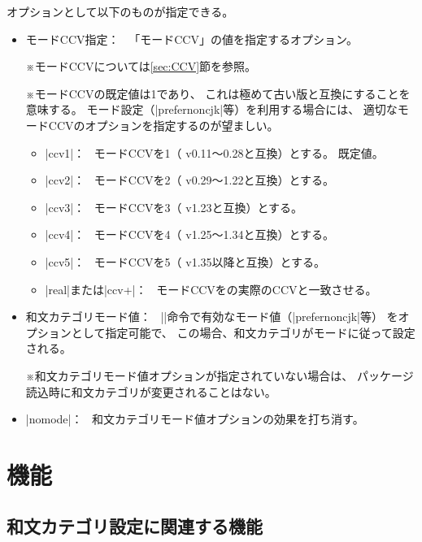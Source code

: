 \documentclass[uplatex,dvipdfmx,a4paper]{jsarticle}
\newenvironment{myverbatim}
  {\quote\small\verbatim}
  {\endverbatim\endquote}
\newcommand{\Note}{\par\noindent ※}
\newcommand{\Means}{：~}
\newcommand{\strong}{\textsf}
\begin{document}
\begin{myverbatim}
\usepackage[<オプション>]{pxcjkcat}
\end{myverbatim}

オプションとして以下のものが指定できる。

\begin{itemize}
\item \strong{モードCCV指定}\Means
  \<「モードCCV」の値を指定するオプション。
  \Note モードCCVについては\ref{sec:CCV}節を参照。
  \Note モードCCVの既定値は1であり、
  これは極めて古い版と互換にすることを意味する。
  モード設定（|prefernoncjk|等）を利用する場合には、
  適切なモードCCVのオプションを指定するのが望ましい。
  \begin{itemize}
  \item |ccv1|\Means
    モードCCVを1（{\upTeX} v0.11～0.28と互換）とする。
    \strong{既定値。}
  \item |ccv2|\Means
    モードCCVを2（{\upTeX} v0.29～1.22と互換）とする。
  \item |ccv3|\Means
    モードCCVを3（{\upTeX} v1.23と互換）とする。
  \item |ccv4|\Means
    モードCCVを4（{\upTeX} v1.25～1.34と互換）とする。
  \item |ccv5|\Means
    モードCCVを5（{\upTeX} v1.35以降と互換）とする。
  \item |real|または|ccv+|\Means
    モードCCVを{\upTeX}の実際のCCVと一致させる。
  \end{itemize}
\item \strong{和文カテゴリモード値}\Means
  |\cjkcategorymode|命令で有効なモード値（|prefernoncjk|等）
  をオプションとして指定可能で、
  この場合、和文カテゴリがモードに従って設定される。
  \Note 和文カテゴリモード値オプションが指定されていない場合は、
  パッケージ読込時に和文カテゴリが変更されることはない。
\item |nomode|\Means
  和文カテゴリモード値オプションの効果を打ち消す。
\end{itemize}

\section{機能}
\label{sec:Function}

\subsection{和文カテゴリ設定に関連する機能}
\label{ssec:cjkcategory-function}
\end{document}
